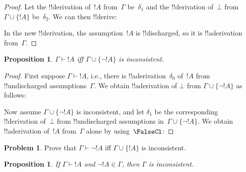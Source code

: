 \documentclass[10pt,a4paper]{article}
\theoremstyle{plain}
\newtheorem{prop}[thm]{Proposition}
\theoremstyle{definition}
\newtheorem{prob}{Problem}[section]
\theoremstyle{remark}
\newcommand*{\ollabel}[1]{\label{#1}}
\providecommand{\AxiomC}[1]{}
\providecommand{\UnaryInfC}[1]{}
\providecommand{\BinaryInfC}[1]{}
\providecommand{\RightLabel}[1]{}
\newenvironment{prooftree}{}{}
\providecommand{\lfalse}{\bot}
\providecommand{\Proves}{\mathrel{\vdash}}
\providecommand{\Elim}[1]{}
\providecommand{\Intro}[1]{}
\providecommand{\Discharge}{\mathrm{Dis}}
\providecommand{\Intro}{\mathrm{I}}
\begin{document}
\begin{proof}
Let the !!{derivation} of~$!A$ from~$\Gamma$ be~$\delta_1$ and the
!!{derivation} of~$\lfalse$ from $\Gamma \cup \{!A\}$
be~$\delta_2$. We can then !!{derive}:
\begin{prooftree}
\AxiomC{$\Gamma, \Discharge{!A}{1}$}
\RightLabel{$\delta_2$}
\DeduceC{$\lfalse$}
\DischargeRule{\Intro{\lnot}}{1}
\UnaryInfC{$\lnot !A$}
\AxiomC{$\Gamma$}
\RightLabel{$\delta_1$}
\RightLabel{\Elim{\lnot}}
\BinaryInfC{$\lfalse$}
\end{prooftree}
In the new !!{derivation}, the assumption~$!A$ is !!{discharged}, so it is
!!a{derivation} from~$\Gamma$.
\end{proof}

\begin{prop}
\ollabel{prop:prov-incons}
$\Gamma \Proves !A$ iff $\Gamma \cup \{\lnot !A\}$ is inconsistent.
\end{prop}

\begin{proof}
First suppose $\Gamma \Proves !A$, i.e., there is
!!a{derivation}~$\delta_0$ of~$!A$ from !!{undischarged}
assumptions~$\Gamma$. We obtain !!a{derivation} of $\lfalse$ from
$\Gamma \cup \{\lnot !A\}$ as follows:
\begin{prooftree}
  \AxiomC{$\lnot !A$}
  \AxiomC{$\Gamma$}
  \RightLabel{$\delta_0$}
  \RightLabel{\Elim{\lnot}}
  \BinaryInfC{$\lfalse$}
\end{prooftree}

Now assume $\Gamma \cup \{\lnot !A\}$ is inconsistent, and let
$\delta_1$ be the corresponding !!{derivation} of~$\lfalse$ from
!!{undischarged} assumptions in~$\Gamma \cup \{\lnot !A\}$. We obtain
!!a{derivation} of~$!A$ from~$\Gamma$ alone by using~$\FalseCl$:
\begin{prooftree}
  \AxiomC{$\Gamma, \Discharge{\lnot !A}{1}$}
  \RightLabel{$\delta_1$}
  \DeduceC{$\lfalse$}
  \RightLabel{\FalseCl}
  \UnaryInfC{$!A$}
\end{prooftree}
\end{proof}

\begin{prob}
Prove that $\Gamma \Proves \lnot !A$ iff $\Gamma \cup \{!A\}$ is
inconsistent.
\end{prob}

\begin{prop}\ollabel{prop:explicit-inc}
  If $\Gamma \Proves !A$ and $\lnot !A \in \Gamma$, then $\Gamma$ is
  inconsistent.
\end{prop}
\end{document}
